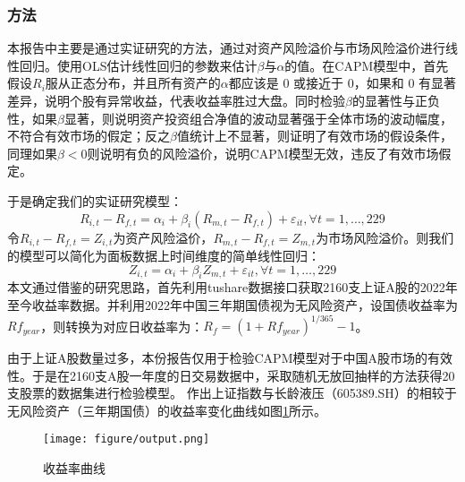 \documentclass{xjtureport}
\begin{document}
\subsubsection{方法}
本报告中主要是通过实证研究的方法，通过对资产风险溢价与市场风险溢价进行线性回归。使用OLS估计线性回归的参数来估计$\beta$与$\alpha$的值。在CAPM模型中，首先假设$R_i$服从正态分布，并且所有资产的$\alpha$都应该是 0 或接近于 0，如果和 0 有显著差异，说明个股有异常收益，代表收益率胜过大盘。同时检验$\beta$的显著性与正负性，如果$\beta$显著，则说明资产投资组合净值的波动显著强于全体市场的波动幅度，不符合有效市场的假定；反之$\beta$值统计上不显著，则证明了有效市场的假设条件，同理如果$\beta <0$则说明有负的风险溢价，说明CAPM模型无效，违反了有效市场假定。
\par 于是确定我们的实证研究模型：
\begin{equation}
    R_{i,t}-R_{f,t} = \alpha_i + \beta_i(R_{m,t} - R_{f,t}) + \varepsilon_{it}, \forall t=1, \ldots ,229
\end{equation}
令$R_{i,t}-R_{f,t}=Z_{i,t}$为资产风险溢价，$R_{m,t}-R_{f,t} = Z_{m,t}$为市场风险溢价。则我们的模型可以简化为面板数据上时间维度的简单线性回归：
\begin{equation}
    Z_{i,t} = \alpha_i + \beta_i Z_{m,t} + \varepsilon_{it}, \forall t=1, \ldots ,229
\end{equation}
本文通过借鉴\cite{ref2}的研究思路，首先利用tushare数据接口获取2160支上证A股的2022年至今收益率数据。并利用2022年中国三年期国债视为无风险资产，设国债收益率为$Rf_{year}$，则转换为对应日收益率为：$R_f=(1+Rf_{year})^{1/365}-1$。
\par 由于上证A股数量过多，本份报告仅用于检验CAPM模型对于中国A股市场的有效性。于是在2160支A股一年度的日交易数据中，采取随机无放回抽样的方法获得20支股票的数据集进行检验模型。
作出上证指数与长龄液压（605389.SH）的相较于无风险资产（三年期国债）的收益率变化曲线如图\ref{收益图}所示。
\begin{figure}
    \begin{center}
        \texttt{[image: figure/output.png]}
    \end{center}
    \caption{收益率曲线}
    \label{收益图}
\end{figure}
\end{document}
